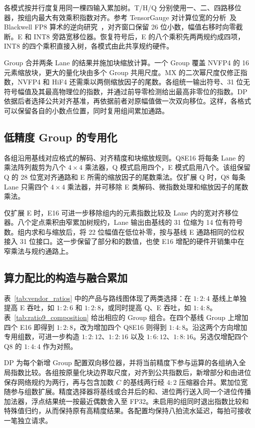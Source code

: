 各模式按并行度复用同一棵四输入累加树。T/H/Q 分别使用一、二、四路移位器，按组内最大有效乘积指数对齐。参考 TensorGauge 对计算位宽的分析~\cite{tensorgauge}及 Blackwell FP8 算术的逆向研究~\cite{xie2025mmasim}，对齐窗口保留 26 位小数，幅值右移时向零截断。E 和 INT8 旁路宽移位器。恢复符号后，E 的八个乘积先两两规约成四项，INT8 的四个乘积直接入树，各模式由此共享规约硬件。

Group 合并两条 Lane 的结果并施加块缩放计算。一个 Group 覆盖 NVFP4 的 16 元素缩放块，更大的量化块由多个 Group 共用尺度。MX 的二次幂尺度仅修正指数，NVFP4 和 HiF4 还需乘以两侧缩放因子的尾数。各组统一输出符号、31 位无符号幅值及其最高物理位的指数，并通过前导零检测给出最高非零位的指数。DP 依据后者选择公共对齐基准，再依据前者对原幅值做一次双向移位。这样，各格式可以保留各自的小数点位置，同时复用组间累加通路。

\subsection{低精度 Group 的专用化}
\label{sec:specialized_midgroups}

各组沿用基线对应格式的解码、对齐精度和块缩放规则。Q8E16 将每条 Lane 的乘法阵列裁剪为八个 $4\times4$ 乘法器，Q 模式启用四个，E 模式启用八个。该组保留 Q 的 28 位宽对齐通路和 E 所需的缩放因子的尾数乘法。仅扩展 Q 时，Q8 每条 Lane 只需四个 $4\times4$ 乘法器，并可移除 E 类解码、微指数处理和缩放因子的尾数乘法。

仅扩展 E 时，E16 可进一步移除组内的元素指数比较及 Lane 内的宽对齐移位器。八个定点乘积由窄累加树规约，Lane 输出由基线的 31 位缩为 14 位有符号数。组内求和与缩放后，将 22 位幅值在低位补零，按与基线 E 通路相同的位权接入 31 位接口。这一步保留了部分和的数值，也使 E16 增配的硬件开销集中在窄乘法与规约通路上。

\subsection{算力配比的构造与融合累加}
\label{sec:expansion}

表~\ref{tab:vendor_ratios} 中的产品与路线图体现了两类选择：在 $1:2:4$ 基线上单独提高 E 吞吐，如 $1:2:6$ 和 $1:2:8$，或同时提高 Q、E 吞吐，如 $1:4:8$。表~\ref{tab:ratio9_composition} 给出相应的 Group 组合。在四个基线 Group 上增加四个 E16 即得到 $1:2:8$，改为增加四个 Q8E16 则得到 $1:4:8$。沿这两个方向增加专用组数，可进一步构造 $1:2:12$、$1:2:16$ 以及 $1:6:12$、$1:8:16$。另选仅增配四个 Q8 的 $1:4:4$ 作为对照。



DP 为每个新增 Group 配置双向移位器，并将当前精度下参与运算的各组纳入全局指数比较。各组按原量化块边界取尺度，对齐到公共指数后，新增部分和由进位保存网络规约为两行，再与包含加数 $C$ 的基线两行经 $4:2$ 压缩器合并。累加位宽随参与组数扩展。精度选择器将基线或合并后的和、进位两行送入同一个进位传播加法器，浮点结果统一按最近偶数舍入至 FP32。未启用的组同时退出指数比较和特殊值归约，从而保持原有高精度结果。各配置均保持八拍流水延迟，每拍可接收一笔独立请求。
